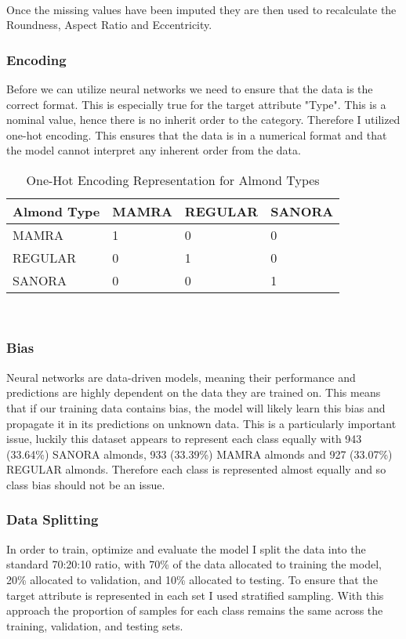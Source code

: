 \documentclass[conference]{IEEEtran}
\begin{document}
\newline \\
Once the missing values have been imputed they are then used to recalculate the Roundness, Aspect Ratio and Eccentricity.
\newline \\
\subsubsection{Encoding}
Before we can utilize neural networks we need to ensure that the data is the correct format. This is especially true for the target attribute "Type". This is a nominal value, hence there is no inherit order to the category. Therefore I utilized one-hot encoding. This ensures that the data is in a numerical format and that the model cannot interpret any inherent order from the data.
\begin{table}[h]
\centering
\caption{One-Hot Encoding Representation for Almond Types}
\begin{tabular}{|p{1.5cm}|p{1.5cm}|p{1.5cm}|p{1.5cm}|}
\hline
\textbf{Almond Type} & \textbf{MAMRA} & \textbf{REGULAR} & \textbf{SANORA} \\
\hline
MAMRA   & 1 & 0 & 0 \\
REGULAR & 0 & 1 & 0 \\
SANORA  & 0 & 0 & 1 \\
\hline
\end{tabular}
\label{tab:one_hot_representation}
\end{table}
\newline \\
\subsubsection{Bias}
Neural networks are data-driven models, meaning their performance and predictions are highly dependent on the data they are trained on. This means that if our training data contains bias, the model will likely learn this bias and propagate it in its predictions on unknown data. This is a particularly important issue, luckily this dataset appears to represent each class equally with 943 (33.64\%) SANORA almonds, 933 (33.39\%) MAMRA almonds and 927 (33.07\%) REGULAR almonds. Therefore each class is represented almost equally and so class bias should not be an issue.
\newline \\
\subsubsection{Data Splitting}
In order to train, optimize and evaluate the model I split the data into the standard 70:20:10 ratio, with 70\% of the data allocated to training the model, 20\% allocated to validation, and 10\% allocated to testing. To ensure that the target attribute is represented in each set I used stratified sampling. With this approach the proportion of samples for each class remains the same across the training, validation, and testing sets.
\newline \\
\end{document}
